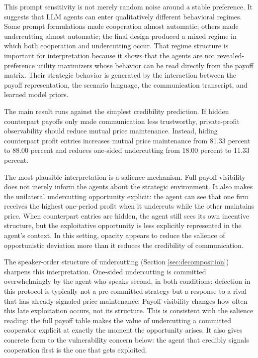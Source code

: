 \documentclass[11pt,a4paper]{article}
\makeatletter
\renewcommand\subsection{\@startsection{subsection}{2}{\z@}{9pt}{6pt}{\normalfont\fontsize{12pt}{14pt}\bfseries}}
\makeatother
\begin{document}
This prompt sensitivity is not merely random noise around a stable preference. It suggests that LLM agents can enter qualitatively different behavioral regimes. Some prompt formulations made cooperation almost automatic; others made undercutting almost automatic; the final design produced a mixed regime in which both cooperation and undercutting occur. That regime structure is important for interpretation because it shows that the agents are not revealed-preference utility maximizers whose behavior can be read directly from the payoff matrix. Their strategic behavior is generated by the interaction between the payoff representation, the scenario language, the communication transcript, and learned model priors.

\subsection{Interpretation of the Effect}

The main result runs against the simplest credibility prediction. If hidden counterpart payoffs only made communication less trustworthy, private-profit observability should reduce mutual price maintenance. Instead, hiding counterpart profit entries increases mutual price maintenance from 81.33 percent to 88.00 percent and reduces one-sided undercutting from 18.00 percent to 11.33 percent.

The most plausible interpretation is a salience mechanism. Full payoff visibility does not merely inform the agents about the strategic environment. It also makes the unilateral undercutting opportunity explicit: the agent can see that one firm receives the highest one-period profit when it undercuts while the other maintains price. When counterpart entries are hidden, the agent still sees its own incentive structure, but the exploitative opportunity is less explicitly represented in the agent's context. In this setting, opacity appears to reduce the salience of opportunistic deviation more than it reduces the credibility of communication.

The speaker-order structure of undercutting (Section \ref{sec:decomposition}) sharpens this interpretation. One-sided undercutting is committed overwhelmingly by the agent who speaks second, in both conditions: defection in this protocol is typically not a pre-committed strategy but a response to a rival that has already signaled price maintenance. Payoff visibility changes how often this late exploitation occurs, not its structure. This is consistent with the salience reading: the full payoff table makes the value of undercutting a committed cooperator explicit at exactly the moment the opportunity arises. It also gives concrete form to the vulnerability concern below: the agent that credibly signals cooperation first is the one that gets exploited.
\end{document}
